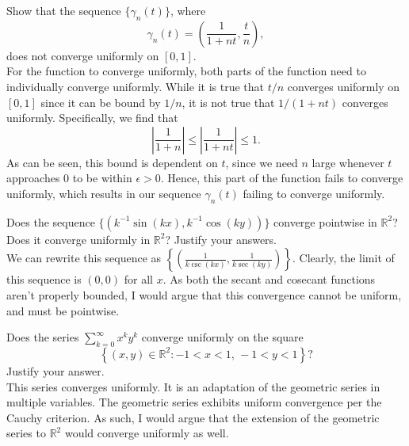 \documentclass[12pt]{book}
\newcommand{\R}{\mathbb{R}}
\newenvironment{exercise}[2][Exercise]{\begin{trivlist}
\item[\hskip \labelsep {\bfseries #1}\hskip \labelsep {\bfseries #2.}]}{\end{trivlist}}
\begin{document}
\begin{exercise}{8.3.1}
Show that the sequence $\{\gamma_n(t)\}$, where 
    \[ \gamma_n(t) = \left( \frac{1}{1+n t}, \frac{t}{n} \right), \]
does not converge uniformly on $[0,1]$. \\

For the function to converge uniformly, both parts of the function need to individually converge uniformly. While it is true that $t/n$ converges uniformly on $[0,1]$ since it can be bound by $1/n$, it is not true that $1/(1+n t)$ converges uniformly. Specifically, we find that 
    \[ \left| \frac{1}{1+n} \right| \leq \left| \frac{1}{1+ n t} \right| \leq 1. \]
As can be seen, this bound is dependent on $t$, since we need $n$ large whenever $t$ approaches 0 to be within $\epsilon>0$. Hence, this part of the function fails to converge uniformly, which results in our sequence $\gamma_n (t)$ failing to converge uniformly.
\end{exercise}



\begin{exercise}{8.3.3}
Does the sequence $\{ \left( k^{-1} \sin(kx), k^{-1} \cos(ky)  \right)\} $ converge pointwise in $\R^2$? Does it converge uniformly in $\R^2$? Justify your answers. \\

We can rewrite this sequence as $\left\{ \left( \frac{1}{k \csc(k x)}, \frac{1}{k \sec(k y)}  \right) \right\}$. Clearly, the limit of this sequence is $(0,0)$ for all $x$. As both the secant and cosecant functions aren't properly bounded, I would argue that this convergence cannot be uniform, and must be pointwise.
\end{exercise}




\begin{exercise}{8.3.8}
Does the series $\sum_{k=0}^\infty x^k y^k $ converge uniformly on the square 
    \[ \left\{ (x,y) \in \R^2 : -1 < x <1,\,  -1 < y < 1   \right\}?\]
Justify your answer. \\

This series converges uniformly. It is an adaptation of the geometric series in multiple variables. The geometric series exhibits uniform convergence per the Cauchy criterion. As such, I would argue that the extension of the geometric series to $\R^2$ would converge uniformly as well.
\end{exercise}
\end{document}
